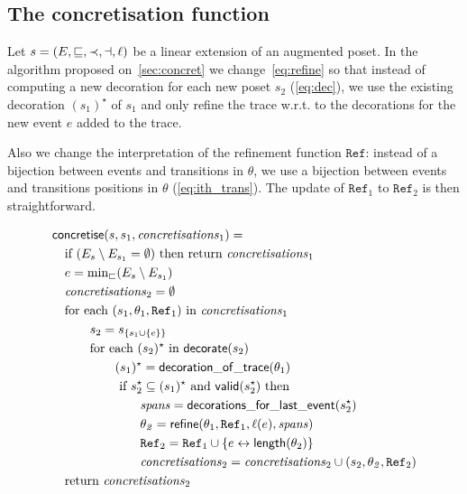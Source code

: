 \subsection{The concretisation function}
\label{sec:app_concret}

Let $s = (E,\sqsubseteq,\prec,\dashv,\ell)$ be a linear extension of an augmented poset.
In the algorithm proposed on~\autoref{sec:concret} we change~\autoref{eq:refine} so that instead of computing a new decoration for each new poset $s_2$ (\autoref{eq:dec}), we use the existing decoration $(s_1)^{\star}$ of $s_1$ and only refine the trace w.r.t. to the decorations for the new event $e$ added to the trace.

Also we change the interpretation of the refinement function $\mathtt{Ref}$: instead of a bijection between events and transitions in $\theta$, we use a bijection between events and transitions positions in $\theta$ (\autoref{eq:ith_trans}). The update of $\mathtt{Ref}_1$ to $\mathtt{Ref}_2$ is then straightforward.

\begin{align}
  &\mathsf{concretise}(s,s_1,\mathit{concretisations}_1) = \\
  &\quad\text{if }(E_s\setminus E_{s_1} = \emptyset)\text{ then return }\mathit{concretisations}_1\\
  &\quad e = \text{min}_{\sqsubset}(E_s\setminus E_{s_1})\\
  &\quad\mathit{concretisations}_2 = \emptyset \\
  &\quad\text{for each }(s_1,\theta_1,\mathtt{Ref}_1)\text{ in }\mathit{concretisations}_1\\
  &\quad\qquad s_2 = s_{\{s_1\cup\{e\}\}}\\
  \label{eq:dec}
  &\quad\qquad\text{for each }(s_2)^{\star}\text{ in }\mathsf{decorate}(s_2)\\
  &\quad\qquad\qquad (s_1)^{\star} = \mathsf{decoration\_of\_trace}(\theta_1)\\
  &\quad\qquad\qquad \text{ if }s_2^{\star}\subseteq (s_1)^{\star}\text{ and }\mathsf{valid}(s_2^{\star})\text{ then }\\
  &\quad\qquad\qquad\qquad \mathit{spans} = \mathsf{decorations\_for\_last\_event}(s_2^{\star})\\
  \label{eq:refine}
  &\quad\qquad\qquad\qquad \mathit{\theta_2} = \mathsf{refine}(\theta_1,\mathtt{Ref}_1,\ell(e),\mathit{spans})\\
  &\quad\qquad\qquad\qquad \mathtt{Ref}_2 = \mathtt{Ref}_1\cup\{e\leftrightarrow\mathsf{length}(\theta_2)\}\\
  &\quad\qquad\qquad\qquad \mathit{concretisations}_2 = \mathit{concretisations}_2 \cup (s_2,\mathit{\theta_2},\mathtt{Ref}_2)\\
  &\quad\text{return }\mathit{concretisations}_2
\end{align}

